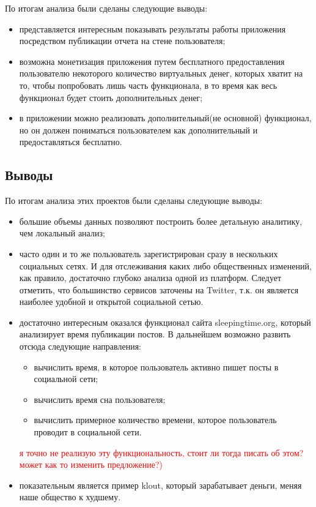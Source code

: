 \begin{itemize}
По итогам анализа были сделаны следующие выводы:
	\begin{itemize}
	\item представляется интересным показывать результаты работы приложения посредством публикации отчета на стене пользователя;
	\item возможна монетизация приложения путем бесплатного предоставления пользователю некоторого количество виртуальных денег, которых хватит на то, чтобы попробовать лишь часть функционала, в то время как весь функционал будет стоить дополнительных денег;
	\item в приложении можно реализовать дополнительный(не основной) функционал, но он должен пониматься пользователем как дополнительный и предоставляться бесплатно.
	\end{itemize}
\subsection{Выводы}
По итогам анализа этих проектов были сделаны следующие выводы:
\begin{itemize}
\item большие объемы данных позволяют построить более детальную аналитику, чем локальный анализ;
\item часто один и то же пользователь зарегистрирован сразу в нескольких социальных сетях. И для отслеживания каких либо общественных изменений, как правило, достаточно глубоко анализа одной из платформ. Следует отметить, что большинство сервисов заточены на Twitter, т.к. он является наиболее удобной и открытой социальной сетью.
\item достаточно интересным оказался функционал сайта  sleepingtime.org, который анализирует время публикации постов. В дальнейшем возможно развить отсюда следующие направления:
	\begin{itemize}
	\item вычислить время, в которое пользователь активно пишет посты в социальной сети;
	\item вычислить время сна пользователя;
	\item вычислить примерное количество времени, которое пользователь проводит в социальной сети.
	\end{itemize}
\textcolor{red}{я точно не реализую эту функциональность, стоит ли тогда писать об этом? может как то изменить предложение?)}
\item показательным является пример klout, который зарабатывает деньги, меняя наше общество к худшему.
\end{itemize}

\end{itemize}

